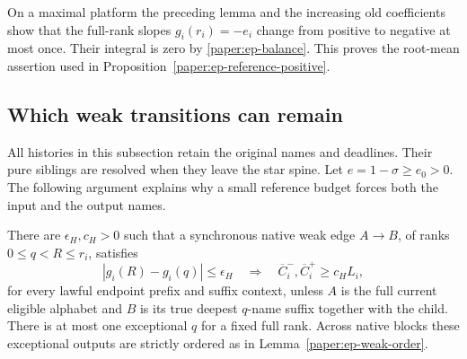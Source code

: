 On a maximal platform the preceding lemma and the increasing old
coefficients show that the full-rank slopes $g_i(r_i)=-e_i$ change
from positive to negative at most once.  Their integral is zero by
\eqref{paper:ep-balance}.  This proves the root-mean assertion used in
Proposition~\ref{paper:ep-reference-positive}.

\subsection{Which weak transitions can remain}
\label{paper:ep-weak-selection}
All histories in this subsection retain the original names and deadlines.
Their pure siblings are resolved when they leave the star spine.
Let $e=1-\sigma\geq e_0>0$.  The following argument explains why a
small reference budget forces both the input and the output names.
\begin{proposition}\label{paper:ep-native-weak}
There are $\epsilon_H,c_H>0$ such that a synchronous native weak edge
$A\to B$, of ranks $0\leq q<R\leq r_i$, satisfies
\[
 |g_i(R)-g_i(q)|\leq\epsilon_H
 \quad\Longrightarrow\quad
 \overline C_i^-,\overline C_i^+\geq c_H L_i,
\]
for every lawful endpoint prefix and suffix context, unless $A$ is the
full current eligible alphabet and $B$ is its true deepest $q$-name
suffix together with the child.  There is at most one exceptional
$q$ for a fixed full rank.  Across native blocks these exceptional
outputs are strictly ordered as in Lemma~\ref{paper:ep-weak-order}.
\end{proposition}
